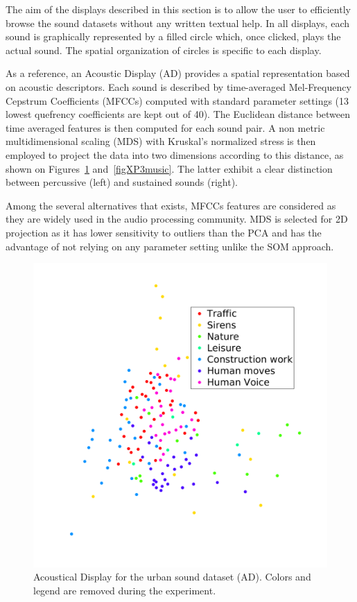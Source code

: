 \documentclass{aes2e}
\begin{document}
The aim of the displays described in this section is to allow the user to efficiently browse the sound datasets without any written textual help. In all displays, each sound is graphically represented by a filled circle which, once clicked, plays the actual sound. The spatial organization of circles is specific to each display.

As a reference, an Acoustic Display (AD) provides a spatial representation based on acoustic descriptors. Each sound is described by time-averaged Mel-Frequency Cepstrum Coefficients (MFCCs) computed with standard parameter settings (13 lowest quefrency coefficients are kept out of 40). The Euclidean distance between time averaged features is then computed for each sound pair. A non metric multidimensional scaling (MDS) with Kruskal's normalized stress \cite{kruskal1964multidimensional} is then employed to project the data into two dimensions according to this distance, as shown on Figures~\ref{figXP3urban} and~\ref{figXP3music}. The latter exhibit a clear distinction between percussive (left) and sustained sounds (right).

Among the several alternatives that exists, MFCCs features are considered as they are widely used in the audio processing community. MDS is selected for 2D projection as it has lower sensitivity to outliers than the PCA and has the advantage of not relying on any parameter setting unlike the SOM approach. 

\begin{figure}[t]
\begin{center}
\includegraphics[width=\columnwidth]{gfx/urban_mds.png} 
\end{center}
\caption{\label{figXP3urban} Acoustical Display for the urban sound dataset (AD). Colors and legend are removed during the experiment.}
\end{figure}
\end{document}
